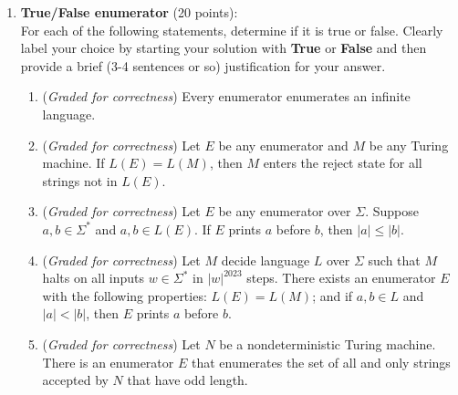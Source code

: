 \documentclass[12pt, oneside]{article}
\newcommand{\gradeCorrect}{({\it Graded for correctness}) }
\begin{document}
\begin{enumerate}
\item \textbf{True/False enumerator} (20 points): \\
For each of the following statements, determine if it is true or false. 
Clearly label your choice 
by starting your solution with {\bf True} or {\bf False} and then
provide a brief (3-4 sentences or so) justification for your answer.
\begin{enumerate}
\item\gradeCorrect Every enumerator enumerates an infinite language.
\item\gradeCorrect Let $E$ be any enumerator and $M$ be any Turing machine.
If $L(E) = L(M)$, then $M$ enters the reject state for all strings not in $L(E)$.
\item\gradeCorrect Let $E$ be any enumerator over $\Sigma$.
Suppose $a, b \in \Sigma^*$ and $a, b \in L(E)$.
If $E$ prints $a$ before $b$, then $|a| \le |b|$.
\item\gradeCorrect Let $M$ decide language $L$ over $\Sigma$
such that $M$ halts on all inputs $w \in \Sigma^*$ in $|w|^{2023}$ steps. 
There exists an enumerator $E$ with the following properties: $L(E) = L(M)$; 
and if $a, b \in L$ and $|a| < |b|$, then $E$ prints $a$ before $b$.
\item\gradeCorrect Let $N$ be a nondeterministic Turing machine. 
There is an enumerator $E$ that enumerates the set of all and only 
strings accepted by $N$ that have odd length.

\end{enumerate}

\end{enumerate}
\end{document}
